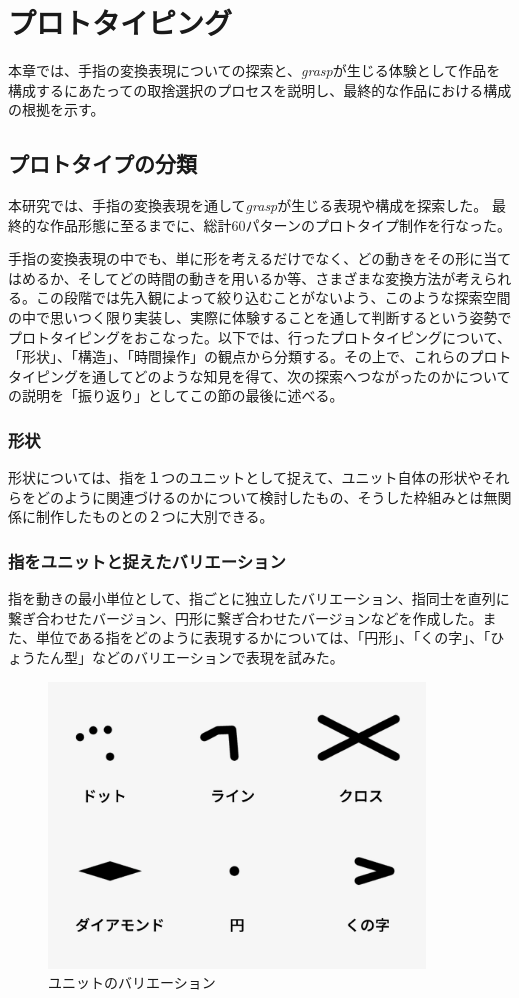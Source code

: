 \chapter{プロトタイピング}
\label{prototyping}
本章では、手指の変換表現についての探索と、\textit{grasp}が生じる体験として作品を構成するにあたっての取捨選択のプロセスを説明し、最終的な作品における構成の根拠を示す。

\section{プロトタイプの分類}
本研究では、手指の変換表現を通して\textit{grasp}が生じる表現や構成を探索した。
最終的な作品形態に至るまでに、総計60パターンのプロトタイプ制作を行なった。

手指の変換表現の中でも、単に形を考えるだけでなく、どの動きをその形に当てはめるか、そしてどの時間の動きを用いるか等、さまざまな変換方法が考えられる。この段階では先入観によって絞り込むことがないよう、このような探索空間の中で思いつく限り実装し、実際に体験することを通して判断するという姿勢でプロトタイピングをおこなった。以下では、行ったプロトタイピングについて、「形状」、「構造」、「時間操作」の観点から分類する。その上で、これらのプロトタイピングを通してどのような知見を得て、次の探索へつながったのかについての説明を「振り返り」としてこの節の最後に述べる。

\subsection{形状}
形状については、指を１つのユニットとして捉えて、ユニット自体の形状やそれらをどのように関連づけるのかについて検討したもの、そうした枠組みとは無関係に制作したものとの２つに大別できる。
\subsection*{指をユニットと捉えたバリエーション}
指を動きの最小単位として、指ごとに独立したバリエーション、指同士を直列に繋ぎ合わせたバージョン、円形に繋ぎ合わせたバージョンなどを作成した。また、単位である指をどのように表現するかについては、「円形」、「くの字」、「ひょうたん型」などのバリエーションで表現を試みた。
\begin{figure}[H]
  \centering
  \includegraphics[width=10cm]{img/unit_valiation.png}
  \caption{ユニットのバリエーション}
  \label{fig:unit_valiation}
\end{figure}

